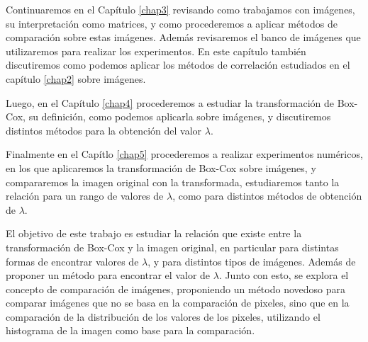 Continuaremos en el Cap\'itulo \ref{chap3} revisando como trabajamos con im\'agenes, su interpretaci\'on como matrices, y como procederemos a aplicar m\'etodos de comparaci\'on sobre estas im\'agenes. Adem\'as revisaremos el banco de im\'agenes que utilizaremos para realizar los experimentos. En este cap\'itulo tambi\'en discutiremos como podemos aplicar los m\'etodos de correlaci\'on estudiados en el cap\'itulo \ref{chap2} sobre im\'agenes.

Luego, en el Cap\'itulo \ref{chap4} procederemos a estudiar la transformaci\'on de Box-Cox, su definici\'on, como podemos aplicarla sobre im\'agenes, y discutiremos distintos m\'etodos para la obtenci\'on del valor $\lambda$. 

Finalmente en el Cap\'itlo \ref{chap5} procederemos a realizar experimentos num\'ericos, en los que aplicaremos la transformaci\'on de Box-Cox sobre im\'agenes, y compararemos la imagen original con la transformada, estudiaremos tanto la relaci\'on para un rango de valores de $\lambda$, como para distintos m\'etodos de obtenci\'on de $\lambda$.

El objetivo de este trabajo es estudiar la relaci\'on que existe entre la transformaci\'on de Box-Cox y la imagen original, en particular para distintas formas de encontrar valores de $\lambda$, y para distintos tipos de im\'agenes. Adem\'as de proponer un m\'etodo para encontrar el valor de $\lambda$. Junto con esto, se explora el concepto de comparaci\'on de im\'agenes, proponiendo un m\'etodo novedoso para comparar im\'agenes que no se basa en la comparaci\'on de pixeles, sino que en la comparaci\'on de la distribuci\'on de los valores de los pixeles, utilizando el histograma de la imagen como base para la comparaci\'on.